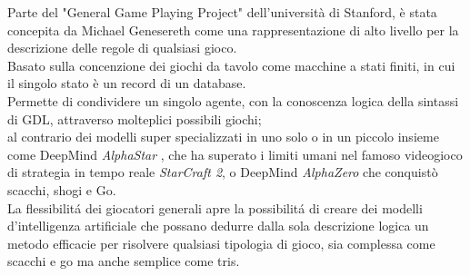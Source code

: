 Parte del "General Game Playing Project" dell'università di Stanford,
è stata concepita da Michael Genesereth come una rappresentazione di alto livello per 
la descrizione delle regole di qualsiasi gioco. \\
Basato sulla concenzione dei giochi da tavolo come macchine a stati finiti, in cui il singolo stato
è un record di un database. \\
Permette di condividere un singolo agente, con la conoscenza logica della sintassi di GDL,
attraverso molteplici possibili giochi; \\ 
al contrario dei modelli super specializzati in uno solo o 
in un piccolo insieme come DeepMind \textit{AlphaStar} \cite{AlphaStar},
che ha superato i limiti umani nel famoso videogioco di strategia in tempo reale \textit{StarCraft 2},
o DeepMind \textit{AlphaZero} \cite{AlphaZero} che conquistò scacchi, shogi e Go. \\
La flessibilitá dei giocatori generali apre la possibilitá di creare dei modelli d'intelligenza artificiale 
che possano dedurre dalla sola descrizione logica un metodo efficacie per risolvere qualsiasi tipologia di gioco,
sia complessa come scacchi e go ma anche semplice come tris.  

